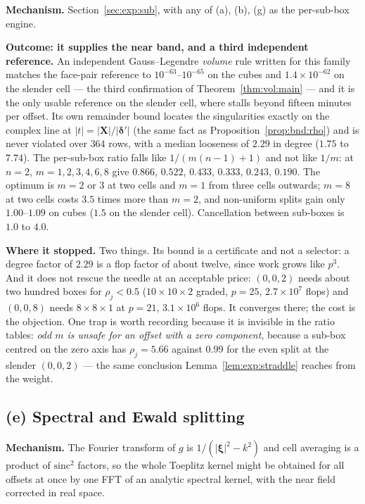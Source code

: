 \textbf{Mechanism.} Section~\ref{sec:exp:sub}, with any of (a), (b), (g) as the per-sub-box
engine.

\textbf{Outcome: it supplies the near band, and a third independent reference.} An
independent  Gauss--Legendre \emph{volume} rule written for this family
matches the face-pair  reference to $10^{-63}$--$10^{-65}$ on the cubes and
$1.4\times10^{-62}$ on the slender cell --- the third confirmation of
Theorem~\ref{thm:vol:main} --- and it is the only usable reference on the slender cell,
where  stalls beyond fifteen minutes per offset. Its own remainder bound
locates the singularities exactly on the complex line at $|t| = |\mathbf{X}|/
|\boldsymbol{\delta}'|$ (the same fact as Proposition~\ref{prop:bnd:rho}) and is never
violated over $364$ rows, with a median looseness of $2.29$ in degree ($1.75$ to $7.74$).
The per-sub-box ratio falls like $1/(m(n-1)+1)$ and not like $1/m$: at $n = 2$,
$m = 1,2,3,4,6,8$ give $0.866$, $0.522$, $0.433$, $0.333$, $0.243$, $0.190$. The optimum
is $m = 2$ or $3$ at two cells and $m = 1$ from three cells outwards; $m = 8$ at two cells
costs $3.5$ times more than $m = 2$, and non-uniform splits gain only $1.00$--$1.09$ on
cubes ($1.5$ on the slender cell). Cancellation between sub-boxes is $1.0$ to $4.0$.

\textbf{Where it stopped.} Two things. Its bound is a certificate and not a selector: a
degree factor of $2.29$ is a flop factor of about twelve, since work grows like $p^3$.
And it does not rescue the needle at an acceptable price: $(0,0,2)$ needs about two
hundred boxes for $\rho_j < 0.5$ ($10\times10\times2$ graded, $p = 25$,
$2.7\times10^{7}$ flops) and $(0,0,8)$ needs $8\times8\times1$ at $p = 21$,
$3.1\times10^{6}$ flops. It converges there; the cost is the objection. One trap is worth
recording because it is invisible in the ratio tables: \emph{odd $m$ is unsafe for an
offset with a zero component}, because a sub-box centred on the zero axis has
$\rho_j = 5.66$ against $0.99$ for the even split at the slender $(0,0,2)$ ---
the same conclusion Lemma~\ref{lem:exp:straddle} reaches from the weight.

\subsection{(e) Spectral and Ewald splitting}
\label{sec:reg:e}

\textbf{Mechanism.} The Fourier transform of $g$ is $1/(|\boldsymbol{\xi}|^2-k^2)$ and
cell averaging is a product of $\mathrm{sinc}^2$ factors, so the whole Toeplitz kernel
might be obtained for all offsets at once by one FFT of an analytic spectral kernel, with
the near field corrected in real space.


